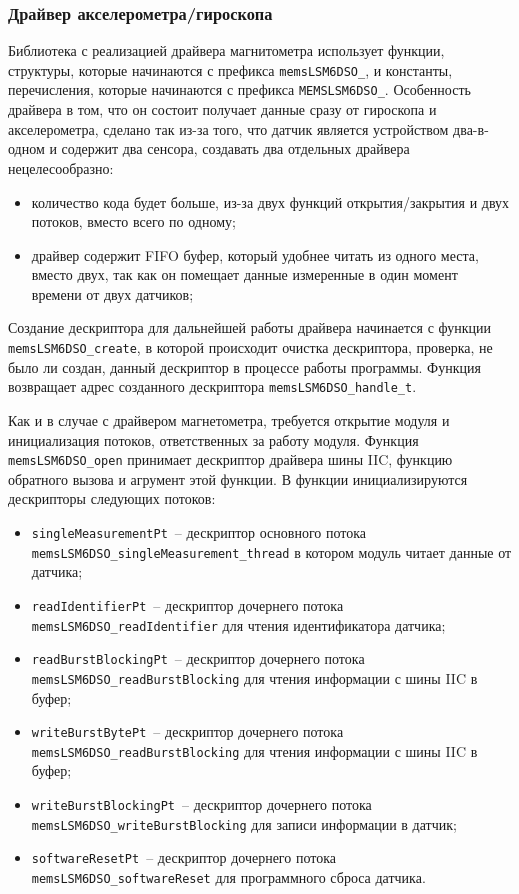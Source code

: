 \subsubsection{Драйвер акселерометра/гироскопа}
Библиотека с реализацией драйвера магнитометра использует функции, структуры,
которые начинаются с префикса \lstinline{memsLSM6DSO_}, и константы, перечисления, которые начинаются с префикса \lstinline{MEMSLSM6DSO_}.
Особенность драйвера в том, что он состоит получает данные сразу от гироскопа и акселерометра, сделано так из-за
того, что датчик является устройством два-в-одном и содержит два сенсора, создавать два отдельных драйвера нецелесообразно:
\begin{itemize}
    \item количество кода будет больше, из-за двух функций открытия/закрытия и двух потоков, вместо всего по одному;
    \item драйвер содержит FIFO буфер, который удобнее читать из одного места, вместо двух, так как он помещает данные
    измеренные в один момент времени от двух датчиков;
\end{itemize}


Создание дескриптора для дальнейшей работы драйвера начинается с функции \lstinline{memsLSM6DSO_create}, в
которой происходит очистка дескриптора, проверка, не было ли создан, данный дескриптор в процессе работы программы.
Функция возвращает адрес созданного дескриптора \lstinline{memsLSM6DSO_handle_t}.

Как и в случае с драйвером магнетометра, требуется открытие модуля и инициализация потоков, ответственных за
работу модуля. Функция \lstinline{memsLSM6DSO_open} принимает дескриптор драйвера шины IIC, функцию обратного вызова
и агрумент этой функции. В функции инициализируются дескрипторы следующих потоков:

\begin{itemize}
    \item \lstinline{singleMeasurementPt}~-- дескриптор основного потока \lstinline{memsLSM6DSO_singleMeasurement_thread} в котором модуль читает данные от датчика;
    \item \lstinline{readIdentifierPt}~-- дескриптор дочернего потока \lstinline{memsLSM6DSO_readIdentifier} для чтения идентификатора датчика;
    \item \lstinline{readBurstBlockingPt}~--  дескриптор дочернего потока \lstinline{memsLSM6DSO_readBurstBlocking} для чтения информации с шины IIC в буфер;
    \item \lstinline{writeBurstBytePt}~--  дескриптор дочернего потока \lstinline{memsLSM6DSO_readBurstBlocking} для чтения информации с шины IIC в буфер;
    \item \lstinline{writeBurstBlockingPt}~--  дескриптор дочернего потока \lstinline{memsLSM6DSO_writeBurstBlocking} для записи информации в датчик;
    \item \lstinline{softwareResetPt}~--  дескриптор дочернего потока \lstinline{memsLSM6DSO_softwareReset} для программного сброса датчика.
\end{itemize}

